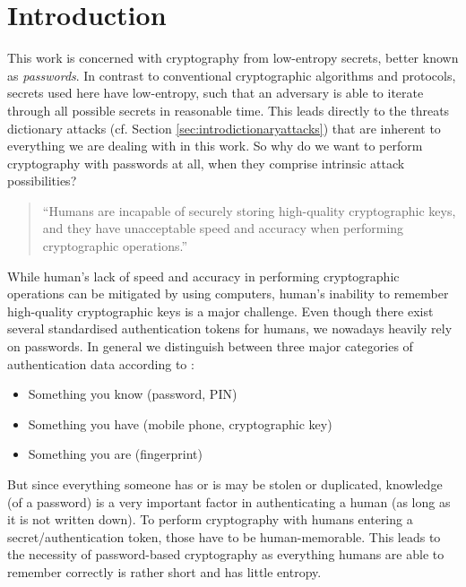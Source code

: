 
\chapter{Introduction}\label{ch:intro}  %

\ifpdf
    \graphicspath{{Chapters/Figs/Raster/}{Chapters/Figs/PDF/}{Chapters/Figs/}}
\else
    \graphicspath{{Chapters/Figs/Vector/}{Chapters/Figs/}}
\fi

This work is concerned with cryptography from low-entropy secrets, better known as \emph{passwords}.
In contrast to conventional cryptographic algorithms and protocols, secrets used here have low-entropy, such that an adversary is able to iterate through all possible secrets in reasonable time.
This leads directly to the threats dictionary attacks (cf. Section \ref{sec:introdictionaryattacks}) that are inherent to everything we are dealing with in this work.
So why do we want to perform cryptography with passwords at all, when they comprise intrinsic attack possibilities?

\begin{quote}
``Humans are incapable of securely storing high-quality cryptographic keys, and they have unacceptable speed and accuracy when performing cryptographic operations.''~\citet{Kaufmann02}
\end{quote}

\noindent
While human's lack of speed and accuracy in performing cryptographic operations can be mitigated by using computers, human's inability to remember high-quality cryptographic keys is a major challenge.
Even though there exist several standardised authentication tokens for humans, we nowadays heavily rely on passwords.
In general we distinguish between three major categories of authentication data according to \citet{Burr11}:
\begin{itemize}
	\item Something you know (\eg password, \ac{PIN})
	\item Something you have (\eg mobile phone, cryptographic key)
	\item Something you are (\eg fingerprint)
\end{itemize}
But since everything someone has or is may be stolen or duplicated, knowledge (of a password) is a very important factor in authenticating a human (as long as it is not written down).
To perform cryptography with humans entering a secret/authentication token, those have to be human-memorable.
This leads to the necessity of password-based cryptography as everything humans are able to remember correctly is rather short and has little entropy.

